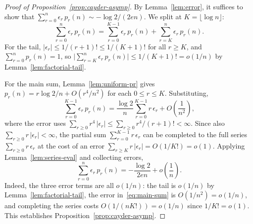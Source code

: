 \documentclass[a4paper,11pt,UKenglish]{article}
\theoremstyle{definition}
\begin{document}
\begin{proof}[Proof of Proposition~\ref{prop:cayder-asymp}]
By Lemma~\ref{lem:error}, it suffices to show that
$\sum_{r=0}^{n} \epsilon_r\, p_r(n) \sim -\log 2/(2en)$.
We split at $K = \lfloor\log n\rfloor$:
\[
  \sum_{r=0}^{n} \epsilon_r\, p_r(n)
  = \sum_{r=0}^{K-1} \epsilon_r\, p_r(n)
  + \sum_{r=K}^{n} \epsilon_r\, p_r(n).
\]
For the tail, $|\epsilon_r| \leq 1/(r+1)! \leq 1/(K+1)!$ for all
$r \geq K$, and $\sum_{r=0}^{n} p_r(n) = 1$, so
$\bigl|\sum_{r=K}^{n} \epsilon_r\, p_r(n)\bigr|
\leq 1/(K+1)! = o(1/n)$ by
Lemma~\ref{lem:factorial-tail}.

For the main sum, Lemma~\ref{lem:uniform-pr} gives
$p_r(n) = r\log 2/n + O(r^4/n^2)$ for each $0 \leq r \leq K$.
Substituting,
\begin{equation}\label{eq:main-sum}
  \sum_{r=0}^{K-1} \epsilon_r\, p_r(n)
  = \frac{\log 2}{n}\sum_{r=0}^{K-1} r\,\epsilon_r
    + O\!\left(\frac{1}{n^2}\right),
\end{equation}
where the error uses
$\sum_{r \geq 0} r^4\,|\epsilon_r|
\leq \sum_{r \geq 0} r^4/(r+1)! < \infty$.
Since also $\sum_{r \geq 0} r\,|\epsilon_r| < \infty$,
the partial sum $\sum_{r=0}^{K-1} r\,\epsilon_r$ can be completed
to the full series $\sum_{r \geq 0} r\,\epsilon_r$ at the cost of
an error $\sum_{r \geq K} r\,|\epsilon_r| = O(1/K!) = o(1)$.
Applying Lemma~\ref{lem:series-eval} and collecting errors,
\[
  \sum_{r=0}^{n} \epsilon_r\, p_r(n)
  = -\frac{\log 2}{2en} + o\!\left(\frac{1}{n}\right).
\]
Indeed, the three error terms are all $o(1/n)$:
the tail is $o(1/n)$ by Lemma~\ref{lem:factorial-tail},
the error in~\eqref{eq:main-sum} is $O(1/n^2) = o(1/n)$,
and completing the series costs
$O(1/(nK!)) = o(1/n)$ since $1/K! = o(1)$.
This establishes Proposition~\ref{prop:cayder-asymp}.
\end{proof}
\end{document}
